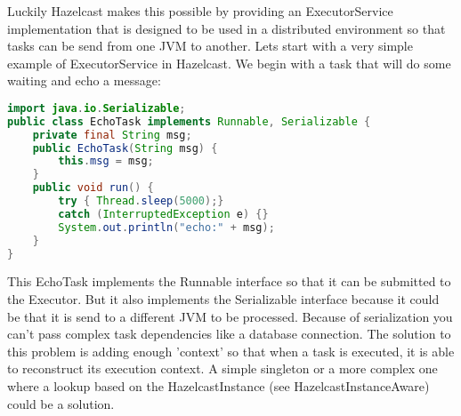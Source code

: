 Luckily Hazelcast makes this possible by providing an ExecutorService implementation that is designed to be used in a distributed environment so that tasks can be send from one JVM to another. Lets start with a very simple example of ExecutorService in Hazelcast. We begin with a task that will do some waiting and echo a message:
\begin{lstlisting}[language=java]
import java.io.Serializable;
public class EchoTask implements Runnable, Serializable {
    private final String msg;
    public EchoTask(String msg) {
        this.msg = msg;
    }
    public void run() {
        try { Thread.sleep(5000);} 
        catch (InterruptedException e) {}
        System.out.println("echo:" + msg);
    }
}
\end{lstlisting}
This EchoTask implements the Runnable interface so that it can be submitted to the Executor. But it also implements the Serializable interface because it could be that it is send to a different JVM to be processed. Because of serialization you can't pass complex task dependencies like a database connection. The solution to this problem is adding enough 'context' so that when a task is executed, it is able to reconstruct its execution context. A simple singleton or a more complex one where a lookup based on the HazelcastInstance (see HazelcastInstanceAware) could be a solution.

